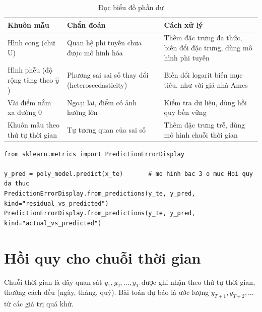 \begin{table}[H]
\centering
\begin{tabular}{|p{3.6cm}|p{4.2cm}|p{5cm}|}
\hline
\textbf{Khuôn mẫu} & \textbf{Chẩn đoán} & \textbf{Cách xử lý} \\
\hline
Hình cong (chữ U) & Quan hệ phi tuyến chưa được mô hình hóa & Thêm đặc trưng đa thức, biến đổi đặc trưng, dùng mô hình phi tuyến \\ \hline
Hình phễu (độ rộng tăng theo $\hat{y}$) & Phương sai sai số thay đổi (heteroscedasticity) & Biến đổi logarit biến mục tiêu, như với giá nhà Ames \\ \hline
Vài điểm nằm xa đường 0 & Ngoại lai, điểm có ảnh hưởng lớn & Kiểm tra dữ liệu, dùng hồi quy bền vững \\ \hline
Khuôn mẫu theo thứ tự thời gian & Tự tương quan của sai số & Thêm đặc trưng trễ, dùng mô hình chuỗi thời gian \\ \hline
\end{tabular}
\caption{Đọc biểu đồ phần dư}
\label{tab:residual-patterns}
\end{table}


\begin{lstlisting}[caption={Vẽ biểu đồ phần dư bằng scikit-learn}]
from sklearn.metrics import PredictionErrorDisplay

y_pred = poly_model.predict(x_te)       # mo hinh bac 3 o muc Hoi quy da thuc
PredictionErrorDisplay.from_predictions(y_te, y_pred, kind="residual_vs_predicted")
PredictionErrorDisplay.from_predictions(y_te, y_pred, kind="actual_vs_predicted")
\end{lstlisting}

\section{Hồi quy cho chuỗi thời gian}

\begin{definition}
Chuỗi thời gian là dãy quan sát $y_1, y_2, \dots, y_T$ được ghi nhận theo thứ tự thời gian, thường cách đều (ngày, tháng, quý). Bài toán dự báo là ước lượng $y_{T+1}, y_{T+2}, \dots$ từ các giá trị quá khứ.
\end{definition}

